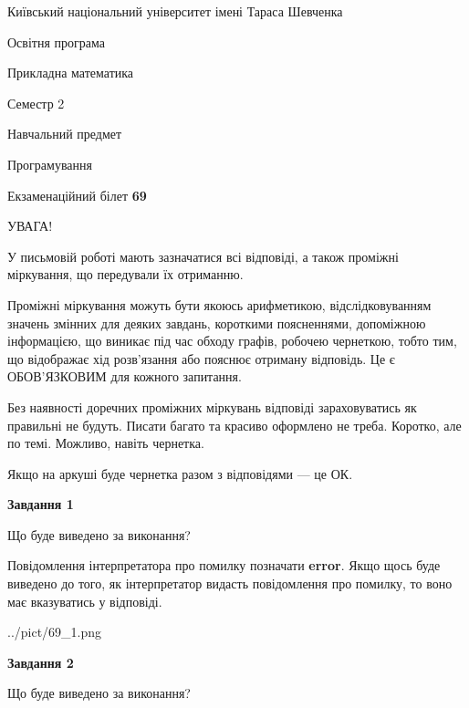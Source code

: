 \documentclass[12pt, ukrainian]{article}
\begin{document}
{{\begin {small}\par
{ \center  Київський національний університет імені Тараса Шевченка \par}
{\parbox {5 cm}{Освітня програма \hfill}{\parbox {7 cm}{Прикладна математика \hfill}}\parbox {6 cm}{\hfill Семестр 2}}\par
{\parbox {5 cm} {Навчальний предмет \hfill}\parbox {7 cm}{Програмування \hfill}\parbox {6cm}{\hfill}\par}\vspace{-7pt} \end{small}}{\center Екзаменаційний білет \No \textbf
{ 69 }\par}}
{
\begin {large}
УВАГА!

У письмовій роботі мають зазначатися всі відповіді, а також проміжні міркування, що передували їх отриманню.

Проміжні міркування можуть бути якоюсь арифметикою, відслідковуванням зна\-чень змінних для деяких завдань,
короткими поясненнями, допоміжною інформацією, що виникає під час обходу графів, робочею чернеткою,
тобто тим, що відображає хід розв’язання або пояснює отриману відповідь.
Це є ОБОВ’ЯЗКОВИМ для кожного запитання.

Без наявності доречних проміжних міркувань відповіді зараховуватись як правиль\-ні не будуть.
Писати багато та красиво оформлено не треба. Коротко, але по темі. Можли\-во, навіть чернетка.

Якщо на аркуші буде чернетка разом з відповідями --- це ОК.

\newpage

{\begin {center}\textbf{Завдання 1}\end {center}}\par
Що буде виведено за виконання?

Повідомлення інтерпретатора про помилку позначати \textbf{error}.
Якщо щось буде виведено до того, як інтерпретатор видасть повідомлення про помилку, 
то воно має вказуватись у відповіді. \par


\begin{center}
	{../pict/69_1.png}
\end{center}
\newpage

{\begin {center}\textbf{Завдання 2}\end {center}}\par
Що буде виведено за виконання?


\end{large}}
\end{document}
